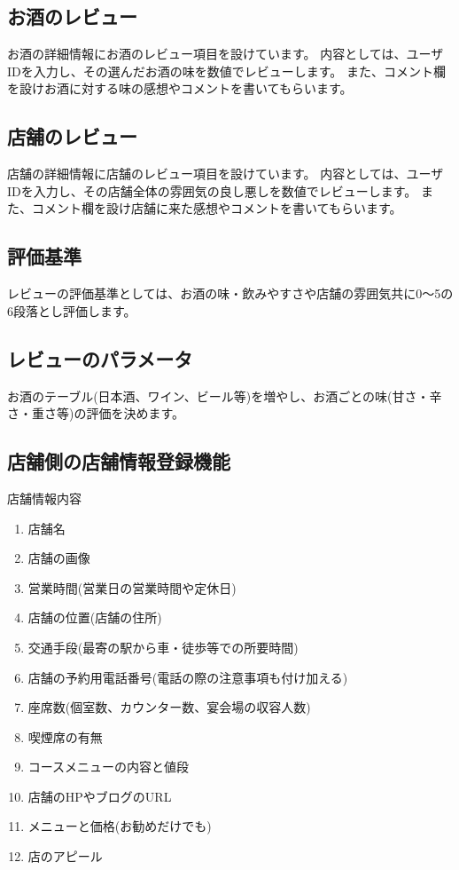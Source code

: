 \documentclass[a4j,titlepage]{jarticle}
\begin{document}
\subsection{お酒のレビュー}
お酒の詳細情報にお酒のレビュー項目を設けています。
内容としては、ユーザIDを入力し、その選んだお酒の味を数値でレビューします。
また、コメント欄を設けお酒に対する味の感想やコメントを書いてもらいます。

\subsection{店舗のレビュー}
店舗の詳細情報に店舗のレビュー項目を設けています。
内容としては、ユーザIDを入力し、その店舗全体の雰囲気の良し悪しを数値でレビューします。
また、コメント欄を設け店舗に来た感想やコメントを書いてもらいます。
\subsection{評価基準}
レビューの評価基準としては、お酒の味・飲みやすさや店舗の雰囲気共に0〜5の6段落とし評価します。
\subsection{レビューのパラメータ}
お酒のテーブル(日本酒、ワイン、ビール等)を増やし、お酒ごとの味(甘さ・辛さ・重さ等)の評価を決めます。
\subsection{店舗側の店舗情報登録機能}
店舗情報内容
\begin{enumerate}
\item 店舗名
\item 店舗の画像
\item 営業時間(営業日の営業時間や定休日)
\item 店舗の位置(店舗の住所)
\item 交通手段(最寄の駅から車・徒歩等での所要時間)
\item 店舗の予約用電話番号(電話の際の注意事項も付け加える)
\item 座席数(個室数、カウンター数、宴会場の収容人数)
\item 喫煙席の有無
\item コースメニューの内容と値段
\item 店舗のHPやブログのURL
\item メニューと価格(お勧めだけでも)
\item 店のアピール
\end{enumerate}
\end{document}
